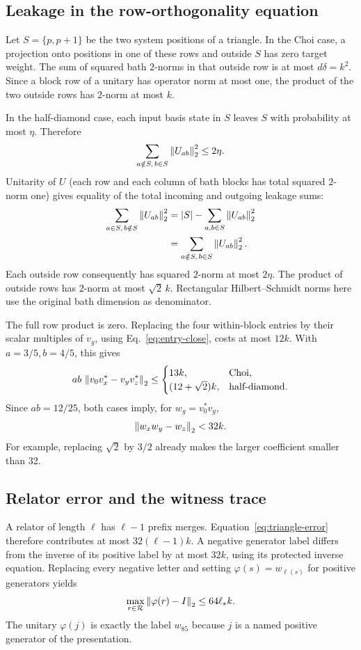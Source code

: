 \subsection{Leakage in the row-orthogonality equation}
Let $S=\{p,p+1\}$ be the two system positions of a triangle. In the Choi case, a
projection onto positions in one of these rows and outside $S$ has zero target weight.
The sum of squared bath $2$-norms in that outside row is at most $d\delta=k^2$.
Since a block row of a unitary has operator norm at most one, the product of the two
outside rows has $2$-norm at most $k$.

In the half-diamond case, each input basis state in $S$ leaves $S$ with probability at
most $\eta$. Therefore
\[
 \sum_{a\notin S,\,b\in S}\left\lVert U_{ab}\right\rVert_2^2\le2\eta.
\]
Unitarity of $U$ (each row and each column of bath blocks has total squared $2$-norm one)
gives equality of the total incoming and outgoing leakage sums:
\begin{align*}
 \sum_{a\in S,\,b\notin S}\left\lVert U_{ab}\right\rVert_2^2
 &=|S|-\sum_{a,b\in S}\left\lVert U_{ab}\right\rVert_2^2\\
 &=\sum_{a\notin S,\,b\in S}\left\lVert U_{ab}\right\rVert_2^2.
\end{align*}
Each outside row consequently has squared $2$-norm at most $2\eta$. The product of
outside rows has $2$-norm at most $\sqrt2\,k$. Rectangular Hilbert--Schmidt norms here
use the original bath dimension as denominator.

The full row product is zero. Replacing the four within-block entries by their scalar
multiples of $v_g$, using Eq.~\eqref{eq:entry-close}, costs at most $12k$.
With $a=3/5,b=4/5$, this gives
\[
 ab\,\left\lVert v_0v_x^*-v_yv_z^*\right\rVert_2
 \le\begin{cases}13k,&\text{Choi},\\(12+\sqrt2)k,&\text{half-diamond}.
 \end{cases}
\]
Since $ab=12/25$, both cases imply, for $w_g=v_0^*v_g$,
\begin{equation}
 \left\lVert w_xw_y-w_z\right\rVert_2<32k.
 \label{eq:triangle-error}
\end{equation}
For example, replacing $\sqrt2$ by $3/2$ already makes the larger coefficient smaller
than 32.

\subsection{Relator error and the witness trace}
A relator of length $\ell$ has $\ell-1$ prefix merges. Equation~\eqref{eq:triangle-error}
therefore contributes at most $32(\ell-1)k$. A negative generator label differs from
the inverse of its positive label by at most $32k$, using its protected inverse equation.
Replacing every negative letter and setting $\varphi(s)=w_{\ell(s)}$ for positive
generators yields
\begin{equation}
 \max_{r\in\mathcal R}\left\lVert \varphi(r)-I\right\rVert_2\le64\ell_* k.
 \label{eq:relator-error}
\end{equation}
The unitary $\varphi(j)$ is exactly the label $w_{85}$ because $j$ is a named positive
generator of the presentation.

